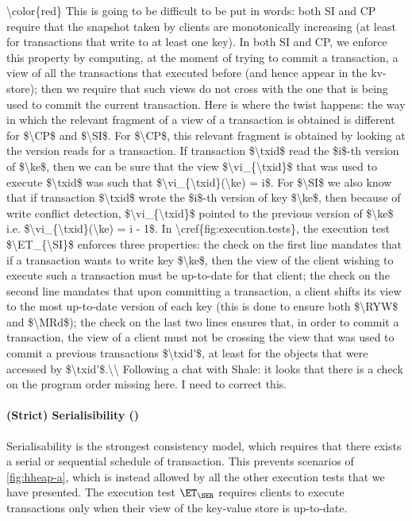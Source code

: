 \ac{\color{red} This is going to be difficult to be put in words: 
both SI and CP require that the snapshot taken by clients are monotonically 
increasing (at least for transactions that write to at least one key). 
In both SI and CP, we enforce this property by computing, at the moment 
of trying to commit a transaction, a view of all the transactions that executed before 
(and hence appear in the kv-store); then we require that such views do not cross 
with the one that is being used to commit the current transaction. Here is where 
the twist happens: the way in which the relevant fragment of a view of 
a transaction is obtained is different for $\CP$ and $\SI$. 
For $\CP$, this relevant fragment is obtained 
by looking at the version reads for a transaction. If transaction $\txid$ read the 
$i$-th version of $\ke$, then we can be sure that the view $\vi_{\txid}$ 
that was used to execute $\txid$ was such that $\vi_{\txid}(\ke) = i$. 
For $\SI$ we also know that if transaction $\txid$ wrote the $i$-th version 
of key $\ke$, then because of write conflict detection, $\vi_{\txid}$ pointed 
to the previous version of $\ke$ i.e. $\vi_{\txid}(\ke) = i - 1$. 
In \cref{fig:execution.tests}, the execution test $\ET_{\SI}$ enforces three properties: 
the check on the first line mandates that  if a transaction wants to write key $\ke$, then the view of the client wishing 
to execute such a transaction must be up-to-date for that client; the check 
on the second line mandates that upon committing 
a transaction, a client shifts its view to the most up-to-date version of each 
key (this is done to ensure both $\RYW$ and $\MRd$); 
the check on the last two lines ensures that, in order to commit a transaction, the 
view of a client must not be crossing the view that was used to commit a previous 
transactions $\txid'$, at least for the objects that were accessed by $\txid'$.\\
Following a chat with Shale: it looks that there is a check on the program order missing 
here. I need to correct this.}

\paragraph{(Strict) Serialisibility (\SER)}
Serialisability is the strongest consistency model, 
which requires that there exists a serial or sequential schedule of transaction. 
This prevents scenarios of \cref{fig:hheap-a},
which is instead allowed by all the other execution tests that we have presented.
The execution test $\ET_{\SER}$ requires 
clients to execute transactions only when their view of the key-value store is up-to-date.
